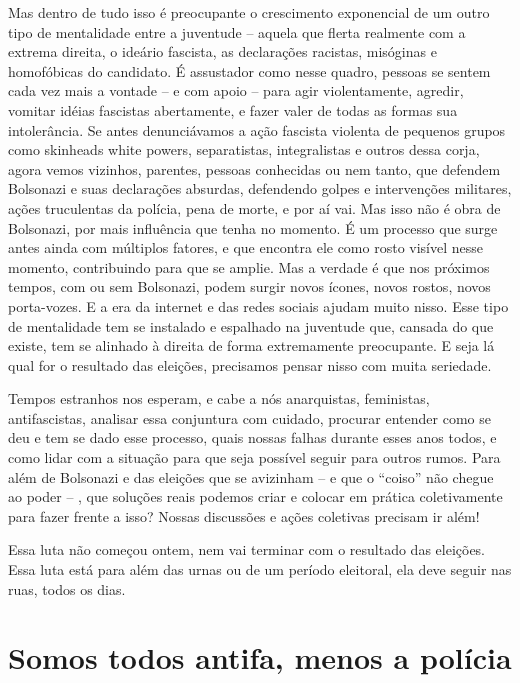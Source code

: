 Mas dentro de tudo isso é preocupante o crescimento exponencial de um outro tipo de mentalidade entre a juventude – aquela que flerta realmente com a extrema direita, o ideário fascista, as declarações racistas, misóginas e homofóbicas do candidato. É assustador como nesse quadro, pessoas se sentem cada vez mais a vontade – e com apoio – para agir violentamente, agredir, vomitar idéias fascistas abertamente, e fazer valer de todas as formas sua intolerância. Se antes denunciávamos a ação fascista violenta de pequenos grupos como skinheads white powers, separatistas, integralistas e outros dessa corja, agora vemos vizinhos, parentes, pessoas conhecidas ou nem tanto, que defendem Bolsonazi e suas declarações absurdas, defendendo golpes e intervenções militares, ações truculentas da polícia, pena de morte, e por aí vai. Mas isso não é obra de Bolsonazi, por mais influência que tenha no momento. É um processo que surge antes ainda com múltiplos fatores, e que encontra ele como rosto visível nesse momento, contribuindo para que se amplie. Mas a verdade é que nos próximos tempos, com ou sem Bolsonazi, podem surgir novos ícones, novos rostos, novos porta-vozes. E a era da internet e das redes sociais ajudam muito nisso. Esse tipo de mentalidade tem se instalado e espalhado na juventude que, cansada do que existe, tem se alinhado à direita de forma extremamente preocupante. E seja lá qual for o resultado das eleições, precisamos pensar nisso com muita seriedade.

Tempos estranhos nos esperam, e cabe a nós anarquistas, feministas, antifascistas, analisar essa conjuntura com cuidado, procurar entender como se deu e tem se dado esse processo, quais nossas falhas durante esses anos todos, e como lidar com a situação para que seja possível seguir para outros rumos. Para além de Bolsonazi e das eleições que se avizinham – e que o “coiso” não chegue ao poder – , que soluções reais podemos criar e colocar em prática coletivamente para fazer frente a isso? Nossas discussões e ações coletivas precisam ir além!

Essa luta não começou ontem, nem vai terminar com o resultado das eleições. Essa luta está para além das urnas ou de um período eleitoral, ela deve seguir nas ruas, todos os dias.

\chapter*{Somos todos antifa, menos a polícia}

